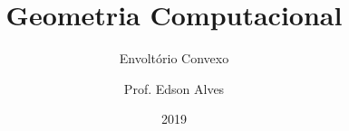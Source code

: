 \title{Geometria Computacional}
\subtitle{Envoltório Convexo}
\date{2019}
\author{Prof. Edson Alves}
